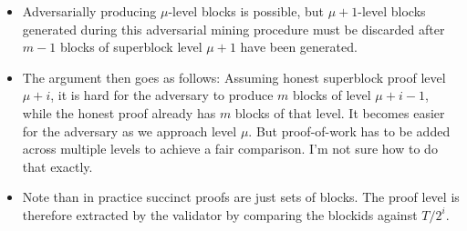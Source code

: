\begin{itemize}
    \item
        Adversarially producing $\mu$-level blocks is possible, but $\mu +
        1$-level blocks generated during this adversarial mining procedure must
        be discarded after $m - 1$ blocks of superblock level $\mu + 1$ have
        been generated.
    \item
        The argument then goes as follows: Assuming honest superblock proof
        level $\mu + i$, it is hard for the adversary to produce $m$ blocks of
        level $\mu + i - 1$, while the honest proof already has $m$ blocks of
        that level. It becomes easier for the adversary as we approach level
        $\mu$. But proof-of-work has to be added across multiple levels to
        achieve a fair comparison. I'm not sure how to do that exactly.
    \item
        Note than in practice succinct proofs are just sets of blocks. The
        proof level is therefore extracted by the validator by comparing
        the blockids against $T / 2^i$.
\end{itemize}
